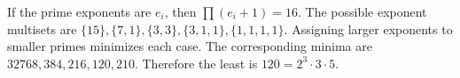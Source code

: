 If the prime exponents are $e_i$, then $\prod(e_i+1)=16$. The possible exponent multisets are $\{15\},\{7,1\},\{3,3\},\{3,1,1\},\{1,1,1,1\}$. Assigning larger exponents to smaller primes minimizes each case. The corresponding minima are $32768,384,216,120,210$. Therefore the least is $\boxed{120=2^3\cdot3\cdot5}$.
